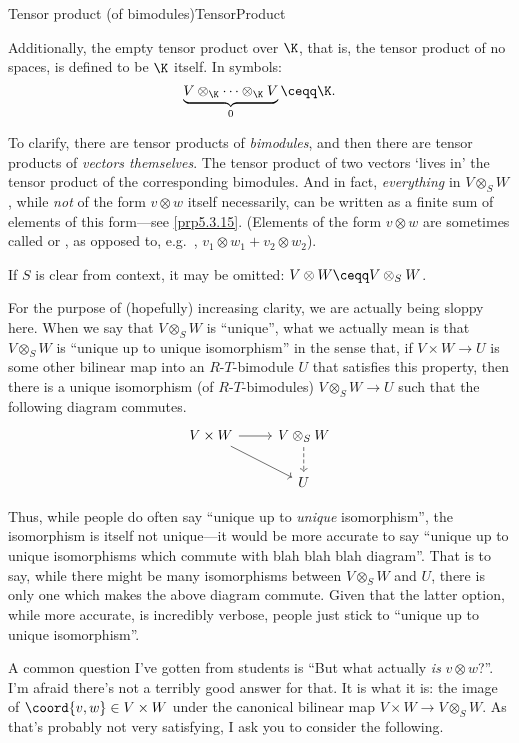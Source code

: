 \begin{thm}{Tensor product (of bimodules)}{TensorProduct}
\begin{rmk}
		Additionally, the empty tensor product over $\K$, that is, the tensor product of no spaces, is defined to be $\K$ itself.  In symbols:
		\begin{equation}
		\underbrace{V\otimes _{\K}\cdots \otimes _{\K}V}_0\ceqq \K .
		\end{equation}
	\end{rmk}
	\begin{rmk}
		To clarify, there are tensor products of \emph{bimodules}, and then there are tensor products of \emph{vectors themselves}.  The tensor product of two vectors `lives in' the tensor product of the corresponding bimodules.  And in fact, \emph{everything} in $V\otimes _SW$, while \emph{not} of the form $v\otimes w$ itself necessarily, can be written as a finite sum of elements of this form---see \cref{prp5.3.15}.  (Elements of the form $v\otimes w$ are sometimes called  or , as opposed to, e.g.~, $v_1\otimes w_1+v_2\otimes w_2$).
	\end{rmk}
	\begin{rmk}
		If $S$ is clear from context, it may be omitted:  $V\otimes W\ceqq V\otimes _SW$\index[notation]{$V\otimes W$}.
	\end{rmk}
	\begin{rmk}
		For the purpose of (hopefully) increasing clarity, we are actually being sloppy here.  When we say that $V\otimes _SW$ is ``unique'', what we actually mean is that $V\otimes _SW$ is ``unique up to unique isomorphism'' in the sense that, if $V\times W\rightarrow U$ is some other bilinear map into an $R$-$T$-bimodule $U$ that satisfies this property, then there is a unique isomorphism (of $R$-$T$-bimodules) $V\otimes _SW\rightarrow U$ such that the following diagram commutes.
		\begin{equation}
		\begin{tikzcd}
		V\times W \ar[r] \ar[rd] & V\otimes _SW \ar[d,dashed] \\
		& U
		\end{tikzcd}
		\end{equation}
		
		Thus, while people do often say ``unique up to \emph{unique} isomorphism'', the isomorphism is itself not unique---it would be more accurate to say ``unique up to unique isomorphisms which commute with blah blah blah diagram''.  That is to say, while there might be many isomorphisms between $V\otimes _SW$ and $U$, there is only one which makes the above diagram commute.  Given that the latter option, while more accurate, is incredibly verbose, people just stick to ``unique up to unique isomorphism''.
	\end{rmk}
	\begin{rmk}
		A common question I've gotten from students is ``But what actually \emph{is} $v\otimes w$?''.  I'm afraid there's not a terribly good answer for that.  It is what it is:  the image of $\coord{v,w}\in V\times W$ under the canonical bilinear map $V\times W\rightarrow V\otimes _SW$.  As that's probably not very satisfying, I ask you to consider the following.
		

\end{rmk}
\end{thm}

